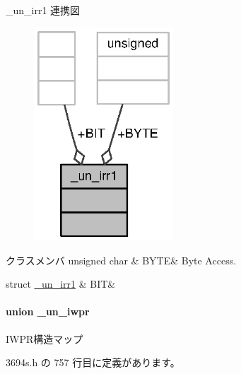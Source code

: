 \+\_\+un\+\_\+irr1 連携図
\nopagebreak
\begin{figure}[H]
\begin{center}
\leavevmode
\includegraphics[width=148pt]{df/da6/union__un__irr1__coll__graph}
\end{center}
\end{figure}
\begin{DoxyFields}{クラスメンバ}
unsigned char\label{3694s_8h_a12543bf3771b71fec64e5926ad1eee48}
&
B\+Y\+T\+E&
Byte Access. \\
\hline

struct \hyperlink{3694s_8h_d8/ded/struct__un__irr1_8BIT}{\+\_\+un\+\_\+irr1}\label{3694s_8h_a403858d2c9b0eea2bfb07bf57465b118}
&
B\+I\+T&
\\
\hline

\end{DoxyFields}
\label{union__un__iwpr}
\paragraph{union \+\_\+un\+\_\+iwpr}
I\+W\+P\+R構造マップ 

 3694s.\+h の 757 行目に定義があります。



